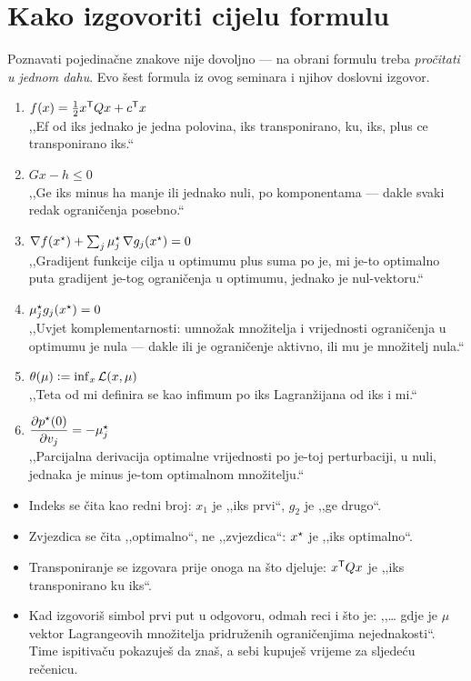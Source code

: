 \section{Kako izgovoriti cijelu formulu}
\label{sec:izgovor-formula}

Poznavati pojedinačne znakove nije dovoljno --- na obrani formulu treba
\emph{pročitati u jednom dahu}. Evo šest formula iz ovog seminara i njihov
doslovni izgovor.

\begin{izgovor}
\begin{enumerate}[leftmargin=*]
  \item $f(x) = \tfrac{1}{2}x^{\mathsf{T}} Q x + c^{\mathsf{T}} x$ \\
        ,,Ef od iks jednako je jedna polovina, iks transponirano, ku, iks, plus ce
        transponirano iks.``
  \item $Gx - h \leq 0$ \\
        ,,Ge iks minus ha manje ili jednako nuli, po komponentama --- dakle svaki
        redak ograničenja posebno.``
  \item $\nabla f(x^{\star}) + \sum_j \mu_j^{\star}\,\nabla g_j(x^{\star}) = 0$ \\
        ,,Gradijent funkcije cilja u optimumu plus suma po je, mi je-to optimalno
        puta gradijent je-tog ograničenja u optimumu, jednako je nul-vektoru.``
  \item $\mu_j^{\star} g_j(x^{\star}) = 0$ \\
        ,,Uvjet komplementarnosti: umnožak množitelja i vrijednosti ograničenja u
        optimumu je nula --- dakle ili je ograničenje aktivno, ili mu je množitelj
        nula.``
  \item $\theta(\mu) \mathrel{\vcentcolon=} \inf_x \mathcal{L}(x,\mu)$ \\
        ,,Teta od mi definira se kao infimum po iks Lagranžijana od iks i mi.``
  \item $\dfrac{\partial p^{\star}(0)}{\partial v_j} = -\mu_j^{\star}$ \\
        ,,Parcijalna derivacija optimalne vrijednosti po je-toj perturbaciji, u
        nuli, jednaka je minus je-tom optimalnom množitelju.``
\end{enumerate}
\end{izgovor}

\begin{izgovor}
\begin{itemize}[nosep,leftmargin=*]
  \item Indeks se čita kao redni broj: $x_1$ je ,,iks prvi``, $g_2$ je ,,ge drugo``.
  \item Zvjezdica se čita ,,optimalno``, ne ,,zvjezdica``: $x^{\star}$ je ,,iks optimalno``.
  \item Transponiranje se izgovara prije onoga na što djeluje:
        $x^{\mathsf{T}} Q x$ je ,,iks transponirano ku iks``.
  \item Kad izgovoriš simbol prvi put u odgovoru, odmah reci i što je:
        ,,\dots{} gdje je $\mu$ vektor Lagrangeovih množitelja pridruženih
        ograničenjima nejednakosti``. Time ispitivaču pokazuješ da znaš, a sebi
        kupuješ vrijeme za sljedeću rečenicu.
\end{itemize}
\end{izgovor}
